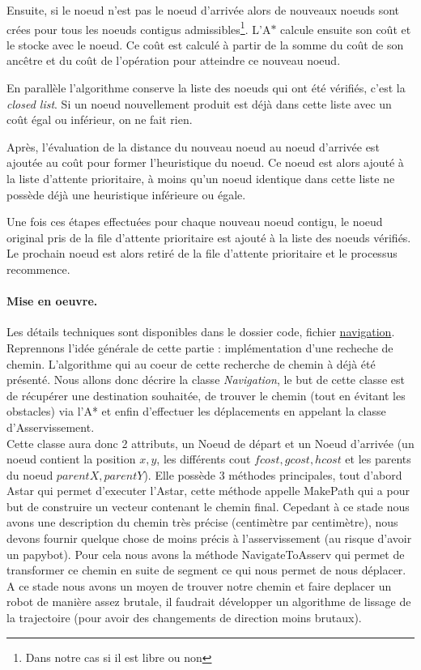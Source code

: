 \documentclass[a4paper,10pt]{report}
\begin{document}
\begin{spacing}{1.5}
Ensuite, si le noeud n'est pas le noeud d'arrivée alors de nouveaux noeuds sont
crées pour tous les noeuds contigus admissibles\footnote{Dans notre cas si il
  est libre ou non}. L'A$\ast$ calcule ensuite son coût et le stocke avec le
noeud. Ce coût est calculé à partir de la somme du coût de son ancêtre et du
coût de l'opération pour atteindre ce nouveau noeud.

En parallèle l'algorithme conserve la liste des noeuds qui ont été vérifiés,
c'est la \textit{closed list}. Si un noeud nouvellement produit est déjà dans
cette liste avec un coût égal ou inférieur, on ne fait rien.

Après, l'évaluation de la distance du nouveau noeud au noeud d'arrivée est ajoutée
au coût pour former l'heuristique du noeud. Ce noeud est alors ajouté à la liste
d'attente prioritaire, à moins qu'un noeud identique dans cette liste ne possède
déjà une heuristique inférieure ou égale.

Une fois ces étapes effectuées pour chaque nouveau noeud contigu, le noeud
original pris de la file d'attente prioritaire est ajouté à la liste des noeuds
vérifiés. Le prochain noeud est alors retiré de la file d'attente prioritaire et
le processus recommence.

\paragraph{Mise en oeuvre.} Les détails techniques sont disponibles dans le
dossier code, fichier
\href{https://github.com/eirbot/eirbot2020-1A/blob/master/code/src/navigation.cpp}{navigation}.
\\ Reprennons l'idée générale de cette partie : implémentation d'une recheche de
chemin. L'algorithme qui au coeur de cette recherche de chemin à déjà été
présenté. Nous allons donc décrire la classe \textit{Navigation}, le but de
cette classe est de récupérer une destination souhaitée, de trouver le chemin
(tout en évitant les obstacles) via l'A* et enfin d'effectuer les déplacements
en appelant la classe d'Asservissement.\\ Cette classe aura donc 2 attributs, un
Noeud de départ et un Noeud d'arrivée (un noeud contient la position $x,y$, les
différents cout $fcost, gcost, hcost$ et les parents du noeud
$parentX,parentY$). Elle possède 3 méthodes principales, tout d'abord Astar qui
permet d'executer l'Astar, cette méthode appelle MakePath qui a pour but de
construire un vecteur contenant le chemin final. Cepedant à ce stade nous avons
une description du chemin très précise (centimètre par centimètre), nous devons
fournir quelque chose de moins précis à l'asservissement (au risque d'avoir un
papybot). Pour cela nous avons la méthode NavigateToAsserv qui permet de
transformer ce chemin en suite de segment ce qui nous permet de nous déplacer.\\
A ce stade nous avons un moyen de trouver notre chemin et faire deplacer un
robot de manière assez brutale, il faudrait développer un algorithme de lissage
de la trajectoire (pour avoir des changements de direction moins brutaux).

\end{spacing}
\end{document}
